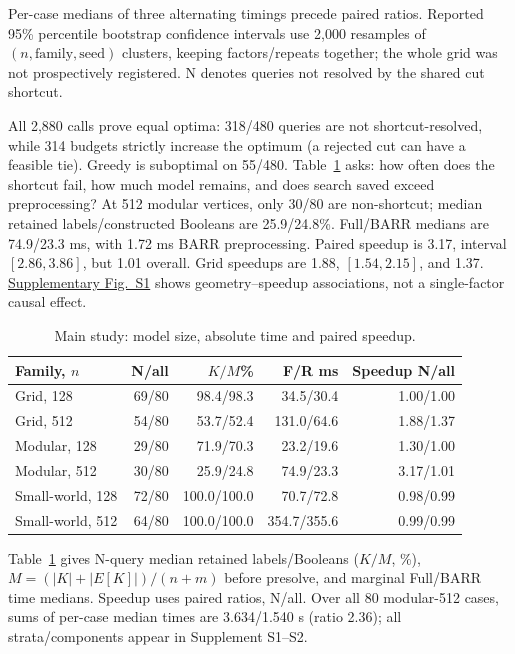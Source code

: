 \documentclass[conference]{IEEEtran}
\begin{document}
Per-case medians of three alternating timings precede paired ratios. Reported 95\% percentile bootstrap confidence intervals use 2,000 resamples of $(n,\mathrm{family},\mathrm{seed})$ clusters, keeping factors/repeats together; the whole grid was not prospectively registered. N denotes queries not resolved by the shared cut shortcut.

All 2,880 calls prove equal optima: 318/480 queries are not shortcut-resolved, while 314 budgets strictly increase the optimum (a rejected cut can have a feasible tie). Greedy is suboptimal on 55/480. Table~\ref{tab:main} asks: how often does the shortcut fail, how much model remains, and does search saved exceed preprocessing? At 512 modular vertices, only 30/80 are non-shortcut; median retained labels/constructed Booleans are 25.9/24.8\%. Full/BARR medians are 74.9/23.3 ms, with 1.72 ms BARR preprocessing. Paired speedup is 3.17, interval $[2.86,3.86]$, but 1.01 overall. Grid speedups are 1.88, $[1.54,2.15]$, and 1.37. \href{https://github.com/elexlebron-spec/cscwd-11/blob/main/paper/supplementary/BARR_Analysis_Supplement.pdf}{Supplementary Fig.~S1} shows geometry--speedup associations, not a single-factor causal effect.

\begin{table}[t]
\caption{Main study: model size, absolute time and paired speedup.}\label{tab:main}
\centering\footnotesize\setlength{\tabcolsep}{2pt}
\begin{tabular}{@{}lrrrr@{}}
\toprule Family, $n$ & N/all & $K/M$\% & F/R ms & Speedup N/all\\\midrule
Grid, 128 & 69/80 & 98.4/98.3 & 34.5/30.4 & 1.00/1.00 \\
Grid, 512 & 54/80 & 53.7/52.4 & 131.0/64.6 & 1.88/1.37 \\
Modular, 128 & 29/80 & 71.9/70.3 & 23.2/19.6 & 1.30/1.00 \\
Modular, 512 & 30/80 & 25.9/24.8 & 74.9/23.3 & 3.17/1.01 \\
Small-world, 128 & 72/80 & 100.0/100.0 & 70.7/72.8 & 0.98/0.99 \\
Small-world, 512 & 64/80 & 100.0/100.0 & 354.7/355.6 & 0.99/0.99 \\
\bottomrule\end{tabular}
\end{table}

Table~\ref{tab:main} gives N-query median retained labels/Booleans ($K/M$, \%), $M=(|K|+|E[K]|)/(n+m)$ before presolve, and marginal Full/BARR time medians. Speedup uses paired ratios, N/all. Over all 80 modular-512 cases, sums of per-case median times are 3.634/1.540 s (ratio 2.36); all strata/components appear in Supplement S1--S2.
\end{document}

